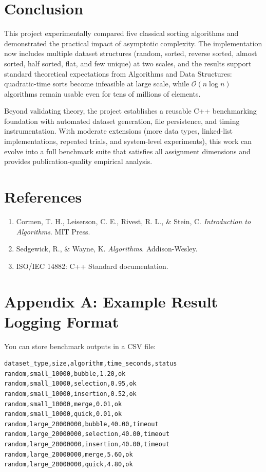 \documentclass[12pt,a4paper]{article}
\begin{document}
\section{Conclusion}
This project experimentally compared five classical sorting algorithms and demonstrated the practical impact of asymptotic complexity. The implementation now includes multiple dataset structures (random, sorted, reverse sorted, almost sorted, half sorted, flat, and few unique) at two scales, and the results support standard theoretical expectations from Algorithms and Data Structures: quadratic-time sorts become infeasible at large scale, while $\mathcal{O}(n \log n)$ algorithms remain usable even for tens of millions of elements.

Beyond validating theory, the project establishes a reusable C++ benchmarking foundation with automated dataset generation, file persistence, and timing instrumentation. With moderate extensions (more data types, linked-list implementations, repeated trials, and system-level experiments), this work can evolve into a full benchmark suite that satisfies all assignment dimensions and provides publication-quality empirical analysis.

\section*{References}
\begin{enumerate}
    \item Cormen, T. H., Leiserson, C. E., Rivest, R. L., \& Stein, C. \emph{Introduction to Algorithms}. MIT Press.
    \item Sedgewick, R., \& Wayne, K. \emph{Algorithms}. Addison-Wesley.
    \item ISO/IEC 14882: C++ Standard documentation.
\end{enumerate}

\appendix
\section{Appendix A: Example Result Logging Format}
You can store benchmark outputs in a CSV file:

\begin{lstlisting}
dataset_type,size,algorithm,time_seconds,status
random,small_10000,bubble,1.20,ok
random,small_10000,selection,0.95,ok
random,small_10000,insertion,0.52,ok
random,small_10000,merge,0.01,ok
random,small_10000,quick,0.01,ok
random,large_20000000,bubble,40.00,timeout
random,large_20000000,selection,40.00,timeout
random,large_20000000,insertion,40.00,timeout
random,large_20000000,merge,5.60,ok
random,large_20000000,quick,4.80,ok
\end{lstlisting}
\end{document}
